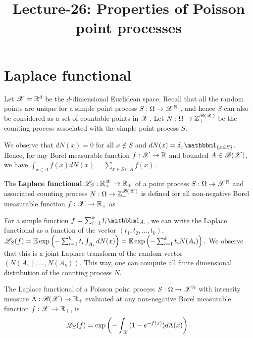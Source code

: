 \documentclass[a4paper,english,10pt]{article}
\title{Lecture-26: Properties of Poisson point processes}
\author{}
\date{}
\begin{document}
\maketitle


\section{Laplace functional}
Let $\mathscr{X} = \mathbb{R}^d$ be the $d$-dimensional Euclidean space. 
Recall that all the random points are unique for a simple point process $S:\Omega\to\mathscr{X}^{\mathbb{N}}$ , 
and hence $S$ can also be considered as a set of countable points in $\mathscr{X}$. 
Let $N:\Omega\to\mathbb{Z}_+^{\mathscr{B}(\mathscr{X})}$ be the counting process associated with the simple point process $S$. 
\begin{rem} 
We observe that $dN(x) = 0$ for all $x \notin S$ and $dN(x) = \delta_x\SetIn{x \in S}$.  
Hence, for any Borel measurable function $f : \mathscr{X} \to \mathbb{R}$ and bounded $A \in \mathscr{B}(\mathscr{X})$, we have
$
\int_{x \in A}f(x)dN(x) = \sum_{x \in S\cap A}f(x). %
$
\end{rem}
\begin{defn}
The \textbf{Laplace functional} $\mathscr{L}_S: \mathbb{R}_+^{\mathscr{X}}\to\mathbb{R}_+$ of a point process $S:\Omega\to\mathscr{X}^{\mathbb{N}}$ and associated counting process $N:\Omega\to\mathbb{Z}_+^{\mathscr{B}(\mathscr{X})}$ is defined for all non-negative Borel measurable function $f: \mathscr{X} \to \mathbb{R}_+$ as 
\end{defn}
\begin{rem}
For a simple function $f = \sum_{i = 1}^{k}t_i\Ind{A_i}$, we can write the Laplace functional as a function of the vector $(t_1, t_2, \dots, t_k)$, 
$
\mathscr{L}_{S}(f) = \mathbb{E}\exp\left(-\sum_{i=1}^kt_i\int_{A_i}dN(x)\right) = \mathbb{E}\exp\left(-\sum_{i=1}^kt_iN(A_i)\right).
$
We observe that this is a joint Laplace transform of the random vector $(N(A_1), \dots, N(A_k))$. 
This way, one can compute all finite dimensional distribution of the counting process $N$. 
\end{rem}
\begin{prop}
The Laplace functional of a Poisson point process $S:\Omega\to\mathscr{X}^{\mathbb{N}}$ with intensity measure $\Lambda:\mathscr{B}(\mathscr{X})\to\mathbb{R}_+$ evaluated at any non-negative Borel measurable function $f:\mathscr{X}\to\mathbb{R}_+$, 
is 
\begin{equation*}
\mathscr{L}_{S}(f) = \exp\left(-\int_{\mathscr{X}}(1-e^{-f(x)})d\Lambda(x)\right).
\end{equation*}  
\end{prop}
\end{document}
